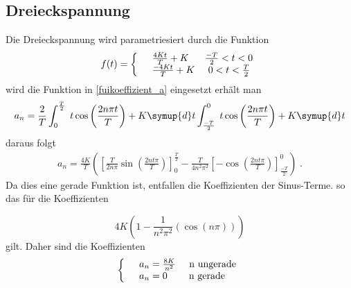 \subsection{Dreieckspannung}
\label{sec:Dreieckspannung}
Die Dreieckspannung wird parametriesiert durch die Funktion
\begin{equation*}
  f(t)=\left\{
  \begin{array}{l l}
    &\frac{4Kt}{T}+K   \;\;\;\;\;\;\frac{-T}{2}<t<0 \\
    &\frac{-4Kt}{T}+K  \;\;\;\;\;0<t<\frac{T}{2}
  \end{array}
  \right.
\end{equation*}
wird die Funktion in \eqref{fuikoeffizient_a} eingesetzt erhält man
\begin{equation*}
  a_n=\frac{2}{T}\int^{\frac{T}{2}}_0 \;t \cos\left(\frac{2n \pi t}{T} \right)
  + K \symup{d}t \int^0_{\frac{-T}{2}} \; t \cos\left(\frac{2n\pi t}{T} \right) + K \symup{d}t
\end{equation*}
daraus folgt
\begin{align*}
  a_n=\frac{4K}{T}\left(\left[ \frac{T}{2n\pi}\sin(\frac{2nt\pi}{T})\right]
  ^\frac{T}{2}_0-\frac{T}{4n^2\pi^2}\left[-\cos\left(\frac{2nt\pi}{T}\right)
  \right]^0_\frac{-T}{2} \right)\;.
\end{align*}
Da dies eine gerade Funktion ist, entfallen die Koeffizienten der Sinus-Terme.
so das für die Koeffizienten

\begin{equation*}
  4K\left(1-\frac{1}{n^2\pi^2}(\cos(n\pi))\right)
\end{equation*}
gilt. Daher sind die Koeffizienten
\begin{equation*}
  \left\{
  \begin{array}{l l}
    &a_n=\frac{8K}{n^2}   \;\;\;\;\;\text{n ungerade} \\
    &a_n=0  \;\;\;\;\;\;\;\;\text{n gerade}
  \end{array}
  \right.
\end{equation*}
